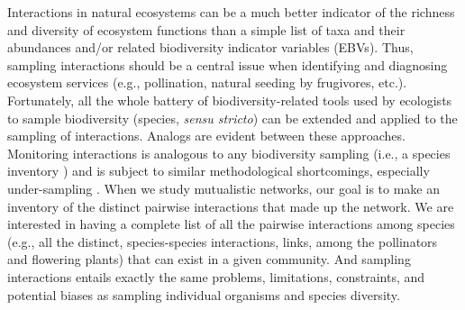 \documentclass[a4paper,12pt]{article}
\begin{document}
\begin{spacing}{1.0}
 Interactions in natural ecosystems can be a much better indicator of the richness and diversity of ecosystem functions than a simple list of taxa and their abundances and\slash or related biodiversity indicator variables (EBVs). Thus, sampling interactions should be a central issue when identifying and diagnosing ecosystem services (e.g., pollination, natural seeding by frugivores, etc.). Fortunately, all the whole battery of biodiversity-related tools used by ecologists to sample biodiversity (species, \emph{sensu stricto}) can be extended and applied to the sampling of interactions. Analogs are evident between these approaches. Monitoring interactions is analogous to any biodiversity sampling (i.e., a species inventory \citep{E31/2562}\citep{Jordano:2009c}) and is subject to similar methodological shortcomings, especially under-sampling \citep{Coddington:2009fi}\citep{Vazquez:2009p82}\citep{Dorado:2011cf}. When we study mutualistic networks, our goal is to make an inventory of the distinct pairwise interactions that made up the network. We are interested in having a complete list of all the pairwise interactions among species (e.g., all the distinct, species-species interactions, links, among the pollinators and flowering plants) that can exist in a given community. And sampling interactions entails exactly the same problems, limitations, constraints, and potential biases as sampling individual organisms and species diversity. 


\end{spacing}
\end{document}
